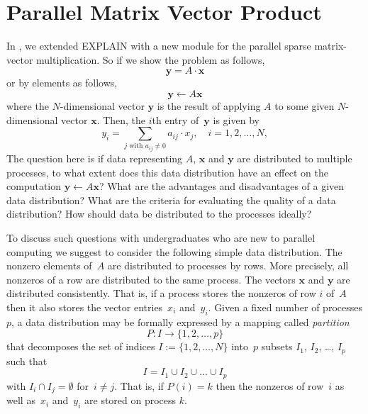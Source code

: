 \documentclass[12pt, oneside]{book}
\newcommand{\mat}[1]{\ensuremath{#1}}
\newcommand{\vek}[1]{{\ensuremath{\mathbf #1}}}
\begin{document}
\section{Parallel Matrix Vector Product}

In \cite{2015:3}, we extended EXPLAIN with a new module for 
the parallel sparse matrix-vector multiplication. 
So if we show the problem as follows, 
$$
\vek{y} = \mat{A}\cdot \vek{x}
$$
or by elements as follows,
\begin{equation}
\label{e.yax}
\vek{y} \leftarrow \mat{A} \vek{x}
\end{equation}
where the $N$-dimensional vector $\vek{y}$ is the result of applying \mat{A} to some
given $N$-dimen\-sional vector $\vek{x}$. Then, the $i$th entry of~$\vek{y}$ is given by
\begin{equation}
\label{e.mvp}
y_i = \sum_{j \text{ with }  a_{ij} \neq 0} a_{ij} \cdot x_j ,
\quad
i = 1, 2, \dots, N,
\end{equation}
The question here is if data representing \mat{A}, \vek{x} and
\vek{y} are distributed to multiple processes, to what extent does this data distribution
have an effect on the computation $\vek{y} \leftarrow \mat{A} \vek{x}$? What are the
advantages and disadvantages of a given data distribution? What are the criteria for
evaluating the quality of a data distribution? How should data be distributed to the
processes ideally?


To discuss such questions with undergraduates who are new to parallel computing we
suggest to consider the following simple data distribution. The nonzero elements
of~\mat{A} are distributed to processes by rows. More precisely, all nonzeros of a row
are distributed to the same process. The vectors \vek{x} and \vek{y} are distributed
consistently. That is, if a process stores the nonzeros of row $i$ of~\mat{A} then it
also stores the vector entries~$x_i$ and~$y_i$. Given a fixed number of processes $p$, a
data distribution may be formally expressed by a mapping called \emph{partition}
$$
P:  I \rightarrow \{1, 2, \dots, p\}
$$
that decomposes the set of indices $I := \{1, 2, \dots, N\}$ into~$p$ subsets $I_1$,
$I_2$, \dots, $I_p$ such that
$$
I = I_1 \cup I_2 \cup \dots \cup I_p
$$
with $I_i \cap I_j = \emptyset$ for~$i \neq j$. That is, if $P(i)=k$ then the nonzeros of
row~$i$ as well as~$x_i$ and~$y_i$ are stored on process $k$.
\end{document}
